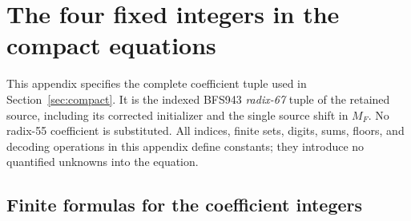 \section{The four fixed integers in the compact equations}
\label{sec:compact-constants}

This appendix specifies the complete coefficient tuple used in
Section~\ref{sec:compact}.  It is the indexed BFS943 \emph{radix-67}
tuple of the retained source, including its corrected initializer and
the single source shift in \(M_F\).\cite{indexed,certificate}
No radix-55 coefficient is substituted.  All indices, finite sets,
digits, sums, floors, and decoding operations in this appendix define
constants; they introduce no quantified unknowns into the equation.

\subsection{Finite formulas for the coefficient integers}

